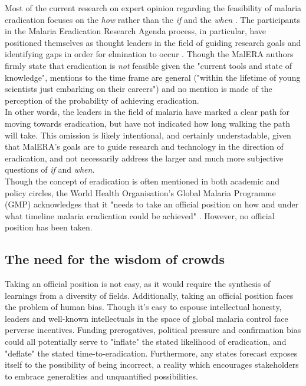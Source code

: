 \documentclass{article}
\begin{document}
\noindent Most of the current research on expert opinion regarding the feasibility of malaria eradication focuses on the \emph{how} rather than the \emph{if} and the \emph{when} \cite{Tanner2015}. The participants in the Malaria Eradication Research Agenda process, in particular, have positioned themselves as thought leaders in the field of guiding research goals and identifying gaps in order for elmination to occur \cite{Alonso2011}. Though the MalERA authors firmly state that eradication is \emph{not} feasible given the "current tools and state of knowledge", mentions to the time frame are general ("within the lifetime of young scientists just embarking on their careers") and no mention is made of the perception of the probability of achieving eradication.  \\


\noindent In other words, the leaders in the field of malaria have marked a clear path for moving towards eradication, but have not indicated how long walking the path will take. This omission is likely intentional, and certainly understadable, given that MalERA's goals are to guide research and technology in the direction of eradication, and not necessarily address the larger and much more subjective questions of \emph{if} and \emph{when}.  \\

\noindent Though the concept of eradication is often mentioned in both academic and policy circles\cite{Mnzava2014, WHO2016}, the World Health Organisation's Global Malaria Programme (GMP) acknowledges that it "needs to take an official position on how and under what timeline malaria eradication could be achieved" \cite{WHO2015}. However, no official position has been taken.

\subsection*{The need for the wisdom of crowds}


\noindent Taking an official position is not easy, as it would require the synthesis of learnings from a diversity of fields.   Additionally, taking an official position faces the problem of human bias. Though it's easy to espouse intellectual honesty, leaders and well-known intellectuals in the space of global malaria control face perverse incentives. Funding prerogatives, political pressure and confirmation bias could all potentially serve to "inflate" the stated likelihood of eradication, and "deflate" the stated time-to-eradication. Furthermore, any states forecast exposes itself to the possibility of being incorrect, a reality which encourages stakeholders to embrace generalities and unquantified possibilities. \\
\end{document}
